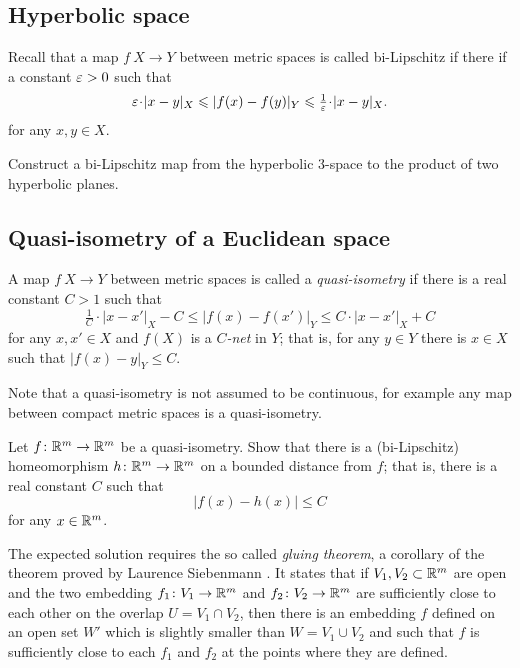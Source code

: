 \subsection*{Hyperbolic space}
\label{Hyperbolic space}

Recall that a map $f\:X\to Y$ between metric spaces is called bi-Lipschitz if there if a constant $\varepsilon>0$
such that 
\[\eps\cdot|x-y|_X\le|f(x)-f(y)|_Y\le\tfrac1\eps\cdot|x-y|_X.\]
for any $x,y\in X$.


\begin{pr}
Construct a bi-Lipschitz map
from the hyperbolic $3$-space 
to the product of two hyperbolic planes.
\end{pr}

\subsection*{Quasi-isometry of a Euclidean space\thm}
\label{hom-near-QI} 

A map $f\:X\to Y$ between metric spaces is called a \emph{quasi-isometry} if there is a  real constant $C>1$ such that 
$$\tfrac{1}{C}\cdot|x-x'|_X-C
\le 
|f(x)-f(x')|_Y\le C\cdot|x-x'|_X+C$$
for any $x,x'\in X$ and $f(X)$ is a \emph{$C$-net} in $Y$;
that is, for any $y\in Y$ there is $x\in X$ such that $|f(x)-y|_Y\le C$.


Note that a quasi-isometry is not assumed to be continuous, for example any map between compact metric spaces is a quasi-isometry.

\begin{pr}
Let $f\colon\mathbb{R}^m\to\mathbb{R}^m$ be a quasi-isometry.
Show that there is a (bi-Lipschitz) homeomorphism 
$h\colon\mathbb{R}^m\to\mathbb{R}^m$ on a bounded distance from $f$;
that is, there is a real constant $C$ such that
$$|f(x)-h(x)|\le C$$
for any $x\in\mathbb{R}^m$.
\end{pr}

The expected solution requires the so called \emph{gluing theorem},
a corollary of the theorem proved by Laurence Siebenmann \cite[see][]{siebenmann}.
It states that 
if $V_1, V_2\subset\mathbb{R}^m$ are open
and the two embedding $f_1\colon V_1\to\mathbb{R}^m$ and $f_2\colon V_2\to\mathbb{R}^m$ 
are sufficiently close to each other 
on the overlap $U=V_1\cap V_2$, 
then
there is an embedding $f$ defined on an open set $W'$
which is slightly smaller than $W=V_1\cup V_2$
and such that $f$ is sufficiently close to each $f_1$ and $f_2$ at the points where they are defined.

